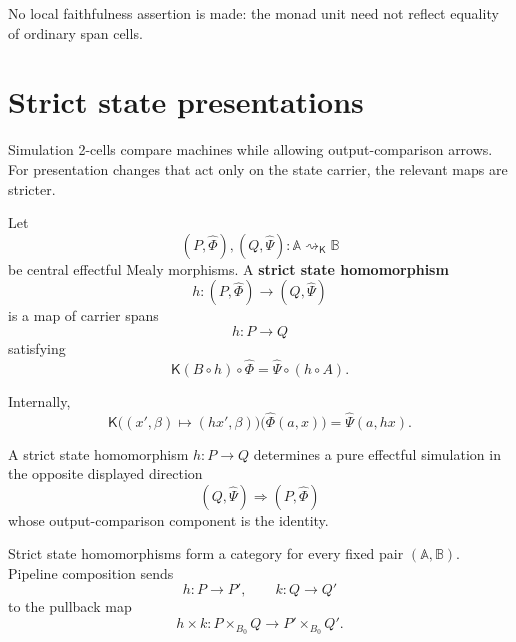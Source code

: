 No local faithfulness assertion is made: the monad unit need not reflect
equality of ordinary span cells.

\section{Strict state presentations}
\label{sec:effectful-strict-state-presentations}

Simulation 2-cells compare machines while allowing output-comparison arrows.
For presentation changes that act only on the state carrier, the relevant
maps are stricter.

\begin{definition}
\label{def:strict-effectful-state-homomorphism}
Let
\[
    (P,\widehat\Phi),
    (Q,\widehat\Psi):
    \mathbb A\rightsquigarrow_{\mathsf K}\mathbb B
\]
be central effectful Mealy morphisms.  A \textbf{strict state homomorphism}
\[
    h:
    (P,\widehat\Phi)
    \longrightarrow
    (Q,\widehat\Psi)
\]
is a map of carrier spans
\[
    h:P\longrightarrow Q
\]
satisfying
\[
    \mathsf K(B\circ h)
    \circ
    \widehat\Phi
    =
    \widehat\Psi
    \circ
    (h\circ A).
\]
\end{definition}

Internally,
\[
    \mathsf K
    \bigl(
        (x',\beta)
        \mapsto
        (hx',\beta)
    \bigr)
    \bigl(
        \widehat\Phi(a,x)
    \bigr)
    =
    \widehat\Psi(a,hx).
\]

A strict state homomorphism \(h:P\to Q\) determines a pure effectful
simulation in the opposite displayed direction
\[
    (Q,\widehat\Psi)
    \Rightarrow
    (P,\widehat\Phi)
\]
whose output-comparison component is the identity.

\begin{proposition}
\label{prop:strict-homomorphism-composition}
Strict state homomorphisms form a category for every fixed pair
\((\mathbb A,\mathbb B)\).  Pipeline composition sends
\[
    h:P\to P',
    \qquad
    k:Q\to Q'
\]
to the pullback map
\[
    h\times k:
    P\times_{B_0}Q
    \longrightarrow
    P'\times_{B_0}Q'.
\]
\end{proposition}

